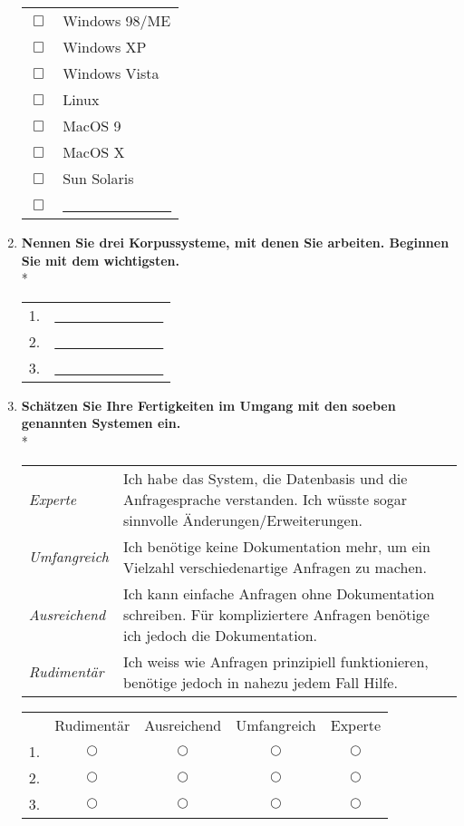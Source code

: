 \begin{enumerate}
{			\begin{tabular}{c l}
				$\Box$ & Windows 98/ME \\
				$\Box$ & Windows XP \\
				$\Box$ & Windows Vista \\
				$\Box$ & Linux \\
				$\Box$ & MacOS 9 \\
				$\Box$ & MacOS X \\
				$\Box$ & Sun Solaris \\
				$\Box$ & \underline{\ \ \ \ \ \ \ \ \ \ \ \ \ \ \ }
			\end{tabular}
	}
	
	\item{
		\textbf{Nennen Sie drei Korpussysteme, mit denen Sie arbeiten. Beginnen Sie mit dem wichtigsten.}\\*
		
			\begin{tabular}{l l}
				1. & \underline{\ \ \ \ \ \ \ \ \ \ \ \ \ \ \ } \\
				2. & \underline{\ \ \ \ \ \ \ \ \ \ \ \ \ \ \ } \\
				3. & \underline{\ \ \ \ \ \ \ \ \ \ \ \ \ \ \ }
			\end{tabular}
	}
	
	\item{
		\textbf{Schätzen Sie Ihre Fertigkeiten im Umgang mit den soeben genannten Systemen ein.}\\*
		\begin{tabular}{l p{300pt}}
			\emph{Experte} & Ich habe das System, die Datenbasis und die Anfragesprache verstanden. Ich wüsste sogar sinnvolle Änderungen/Erweiterungen. \\
			\emph{Umfangreich} & Ich benötige keine Dokumentation mehr, um ein Vielzahl verschiedenartige Anfragen zu machen. \\
			\emph{Ausreichend} & Ich kann einfache Anfragen ohne Dokumentation schreiben. Für kompliziertere Anfragen benötige ich jedoch die Dokumentation. \\
			\emph{Rudimentär} & Ich weiss wie Anfragen prinzipiell funktionieren, benötige jedoch in nahezu jedem Fall Hilfe.
		\end{tabular}
		
		\begin{center}
			\begin{tabular}{r c c c c}
				& Rudimentär & Ausreichend & Umfangreich & Experte \\
				1. & $\bigcirc$ & $\bigcirc$ & $\bigcirc$ & $\bigcirc$ \\ \hline
				2. & $\bigcirc$ & $\bigcirc$ & $\bigcirc$ & $\bigcirc$ \\ \hline
				3. & $\bigcirc$ & $\bigcirc$ & $\bigcirc$ & $\bigcirc$				
			\end{tabular}
		\end{center}
	}



\end{enumerate}
